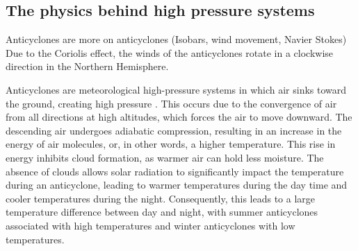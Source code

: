 \subsection{The physics behind high pressure systems}

Anticyclones are 
more on anticyclones (Isobars, wind movement, Navier Stokes)
Due to the Coriolis effect, the winds of the anticyclones rotate in a clockwise direction in the Northern Hemisphere.

Anticyclones are meteorological high-pressure systems in which air sinks toward the ground, creating high pressure \cite{spiridonovCyclonesAnticyclonesSpringerLink2020}. This occurs due to the convergence of air from all directions at high altitudes, which forces the air to move downward. The descending air undergoes adiabatic compression, resulting in an increase in the energy of air molecules, or, in other words, a higher temperature. This rise in energy inhibits cloud formation, as warmer air can hold less moisture. The absence of clouds allows solar radiation to significantly impact the temperature during an anticyclone, leading to warmer temperatures during the day time and cooler temperatures during the night. Consequently, this leads to a large temperature difference between day and night, with summer anticyclones associated with high temperatures and winter anticyclones with low temperatures. 

